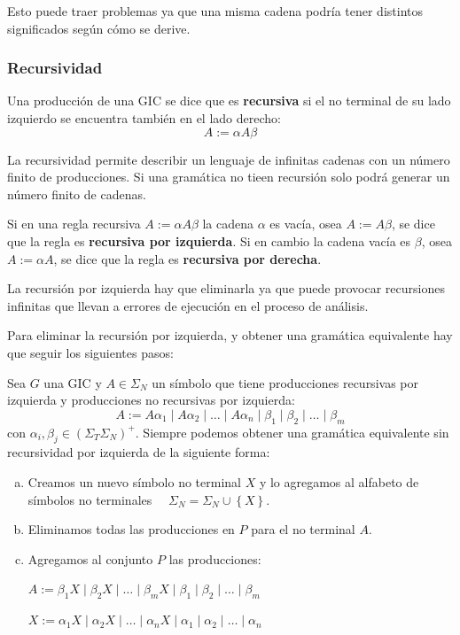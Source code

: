 \documentclass[12pt]{article}
\begin{document}
Esto puede traer problemas ya que una misma cadena podría tener distintos significados según cómo se derive.

\subsubsection{Recursividad}
Una producción de una GIC se dice que es \textbf{recursiva} si el no terminal de su lado izquierdo se encuentra también en el lado derecho:
\[
A:=\alpha A\beta
\]

La recursividad permite describir un lenguaje de infinitas cadenas con un número finito de producciones. Si una gramática no tieen recursión solo podrá generar un número finito de cadenas.

Si en una regla recursiva $ A:=\alpha A\beta $ la cadena $ \alpha $ es vacía, osea $ A:=A\beta $, se dice que la regla es \textbf{recursiva por izquierda}. Si en cambio la cadena vacía es $ \beta $, osea $ A:=\alpha A $, se dice que la regla es \textbf{recursiva por derecha}.

La recursión por izquierda hay que eliminarla ya que puede provocar recursiones infinitas que llevan a errores de ejecución en el proceso de análisis.

Para eliminar la recursión por izquierda, y obtener una gramática equivalente hay que seguir los siguientes pasos:

Sea $ G $ una GIC y $ A \in \Sigma_{N} $ un símbolo que tiene producciones recursivas por izquierda y producciones no recursivas por izquierda:
\[
A:=A\alpha_{1} \mid A\alpha_{2} \mid \dots \mid A\alpha_{n} \mid \beta_{1} \mid \beta_{2} \mid \dots  \mid \beta_{m}
\]
con $ \alpha_{i}, \beta_{j} \in \left(\Sigma_{T}\Sigma_{N}\right)^{+} $. Siempre podemos obtener una gramática equivalente sin recursividad por izquierda de la siguiente forma:
\begin{enumerate}[a)]
  \item Creamos un nuevo símbolo no terminal $ X $ y lo agregamos al alfabeto de símbolos no terminales $ \quad \Sigma_{N} = \Sigma_{N} \cup \left\{X\right\} $.

  \item Eliminamos todas las producciones en $ P $ para el no terminal $ A $.

  \item Agregamos al conjunto $ P $ las producciones:

	  $ A:=\beta_{1}X \mid \beta_{2}X \mid \dots  \mid \beta_{m}X \mid \beta_{1} \mid \beta_{2} \mid \dots  \mid \beta_{m} $

	  $ X:=\alpha_{1}X \mid \alpha_{2}X \mid \dots  \mid \alpha_{n}X \mid \alpha_{1} \mid \alpha_{2} \mid \dots  \mid \alpha_{n} $
\end{enumerate}
\end{document}
